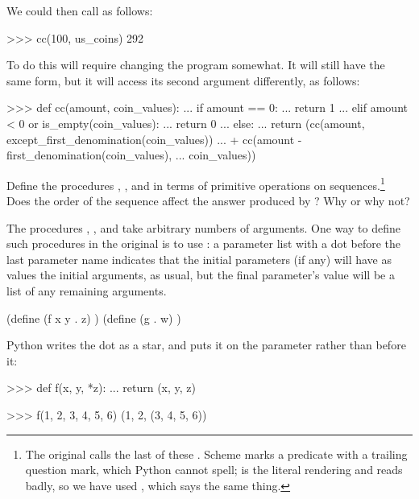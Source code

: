 \begin{exerciseGroup}
We could then call  as follows:

\begin{codeBlock}
>>> cc(100, us_coins)
292
\end{codeBlock}

To do this will require changing the program  somewhat.  It will still
have the same form, but it will access its second argument differently, as
follows:

\begin{codeBlock}
>>> def cc(amount, coin_values):
...     if amount == 0:
...         return 1
...     elif amount < 0 or is_empty(coin_values):
...         return 0
...     else:
...         return (cc(amount, except_first_denomination(coin_values))
...                 + cc(amount - first_denomination(coin_values),
...                      coin_values))
\end{codeBlock}

Define the procedures ,
, and  in terms of primitive
operations on sequences.\footnote{The original calls the last of these
.  Scheme marks a predicate with a trailing question mark, which
Python cannot spell;  is the literal rendering and reads
badly, so we have used , which says the same thing.}  Does the
order of the sequence  affect the answer produced by
?  Why or why not?

\label{Exercise 2.20}
 The procedures \code{+},
\code{*}, and  take arbitrary numbers of arguments.  One way to
define such procedures in the original is to use : a parameter list with a dot before the last parameter name
indicates that the initial parameters (if any) will have as values the initial
arguments, as usual, but the final parameter's value will be a list of any
remaining arguments.

\begin{syntaxForm}
(define (f x y . z) )
(define (g . w) )
\end{syntaxForm}

\noindent
Python writes the dot as a star, and puts it on the parameter rather than
before it:

\begin{codeBlock}
>>> def f(x, y, *z):
...     return (x, y, z)

>>> f(1, 2, 3, 4, 5, 6)
(1, 2, (3, 4, 5, 6))
\end{codeBlock}


\end{exerciseGroup}
